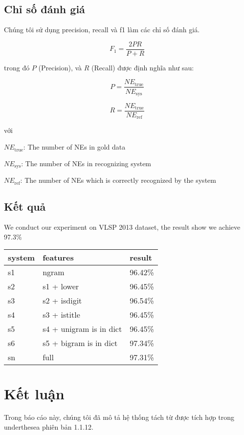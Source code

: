 \documentclass[11pt,a4paper]{article}
\newcommand\version{1.1.12}
\begin{document}
\subsection{Chỉ số đánh giá}

Chúng tôi sử dụng precision, recall và f1 làm các chỉ số đánh giá.


$$F_1 = \frac{2PR}{P + R}$$

trong đó $P$ (Precision), và $R$ (Recall) được định nghĩa như sau:

$$P = \frac{\mathit{NE}_{\mathrm{true}}}{\mathit{NE}_{\mathrm{sys}}}$$

$$R = \frac{\mathit{NE}_{\mathrm{true}}}{\mathit{NE}_{\mathrm{ref}}}$$

với

$\mathit{NE}_{\mathrm{true}}$: The number of NEs in gold data

$\mathit{NE}_{\mathrm{sys}}$: The number of NEs in recognizing system

$\mathit{NE}_{\mathrm{ref}}$: The number of NEs which is correctly recognized by the system

\subsection{Kết quả}

We conduct our experiment on VLSP 2013 dataset, the result show we achieve 97.3\%
\newline

\begin{tabular}{ |l|l|l| }
 \hline
 system & features & result \\
 \hline
 s1 & ngram & 96.42\% \\
 s2 & s1 + lower & 96.45\% \\
 s3 & s2 + isdigit & 96.54\% \\
 s4 & s3 + istitle & 96.45\% \\
 s5 & s4 + unigram is in dict & 96.45\% \\
 s6 & s5 + bigram is in dict & 97.34\% \\
 sn & full & 97.31\% \\
 \hline
\end{tabular}

\section{Kết luận}

Trong báo cáo này, chúng tôi đã mô tả hệ thống tách từ được tích hợp trong underthesea phiên bản \version.



\end{document}
